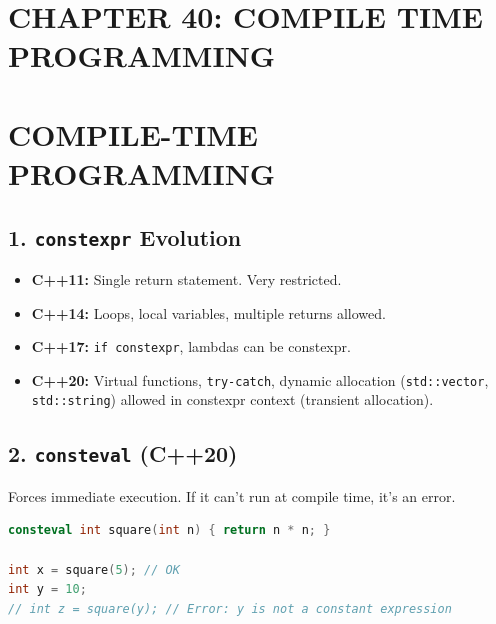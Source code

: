 \hypertarget{chapter-40-compile-time-programming}{%
\section{CHAPTER 40: COMPILE TIME
PROGRAMMING}\label{chapter-40-compile-time-programming}}

\hypertarget{compile-time-programming}{%
\section{COMPILE-TIME PROGRAMMING}\label{compile-time-programming}}

\hypertarget{constexpr-evolution}{%
\subsection{\texorpdfstring{1. \texttt{constexpr}
Evolution}{1. constexpr Evolution}}\label{constexpr-evolution}}

\begin{itemize}
\tightlist
\item
  \textbf{C++11:} Single return statement. Very restricted.
\item
  \textbf{C++14:} Loops, local variables, multiple returns allowed.
\item
  \textbf{C++17:} \passthrough{\lstinline!if constexpr!}, lambdas can be
  constexpr.
\item
  \textbf{C++20:} Virtual functions,
  \passthrough{\lstinline!try-catch!}, dynamic allocation
  (\passthrough{\lstinline!std::vector!},
  \passthrough{\lstinline!std::string!}) allowed in constexpr context
  (transient allocation).
\end{itemize}

\hypertarget{consteval-c20}{%
\subsection{\texorpdfstring{2. \texttt{consteval}
(C++20)}{2. consteval (C++20)}}\label{consteval-c20}}

Forces immediate execution. If it can't run at compile time, it's an
error.

\begin{lstlisting}[language={C++}]
consteval int square(int n) { return n * n; }

int x = square(5); // OK
int y = 10;
// int z = square(y); // Error: y is not a constant expression
\end{lstlisting}

